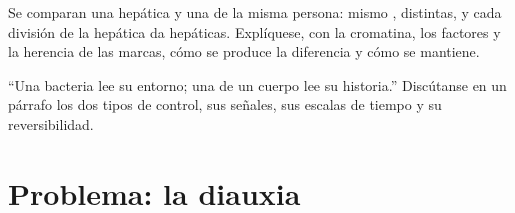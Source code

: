 \begin{exercise}[$\star\star\star$]\label{exo:b1:expression-control:11}
Se comparan una  hepática y una  de la misma persona: mismo
,  distintas, y cada división de la  hepática da
 hepáticas. Explíquese, con la cromatina, los factores y la herencia
de las marcas, cómo se produce la diferencia y cómo se mantiene.
\end{exercise}

\begin{exercise}[$\star\star\star$]\label{exo:b1:expression-control:12}
``Una bacteria lee su entorno; una  de un cuerpo lee su historia.''
Discútanse en un párrafo los dos tipos de control, sus señales, sus escalas
de tiempo y su reversibilidad.
\end{exercise}

\section{Problema: la diauxia}

